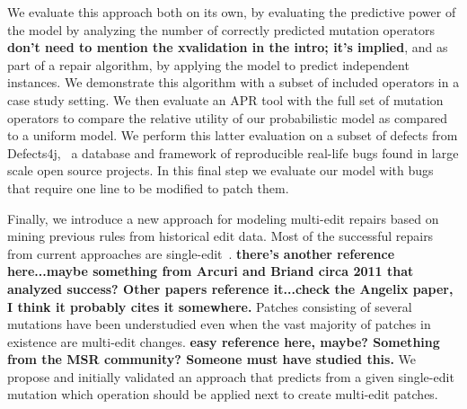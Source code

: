 \documentclass[conference]{IEEEtran}
\newcommand{\todo}[1]
  {{\scriptsize \textbf{\color{red} {#1}}}}
\begin{document}
We evaluate this approach both on its own, by evaluating the predictive power of
the model by analyzing the number of correctly predicted mutation
operators\todo{don't need to mention the xvalidation in the intro; it's implied},
and as part of a repair algorithm, by applying the model to predict independent
instances. We demonstrate this algorithm with a subset of included operators in
a case study setting.  We then evaluate an APR tool with the full set of mutation
operators to compare the relative utility of our probabilistic model as compared
to a uniform model.  We perform this latter evaluation on a subset of defects
from Defects4j,~\cite{just14} a 
database and framework of reproducible real-life bugs found in large scale open 
source projects. In this final step we evaluate our model with bugs that require 
one line to be modified to patch them. 

Finally, we introduce a new approach for modeling multi-edit repairs based on
mining previous rules from historical edit data. Most of the
successful repairs from current approaches are
single-edit~\cite{Weimer13,Qi15,kim2013}.\todo{there's another reference
  here...maybe something from Arcuri and Briand circa 2011 that analyzed
  success?  Other papers reference it...check the Angelix paper, I think it
  probably cites it somewhere.}  Patches
consisting of several mutations have been understudied even when the vast majority
of patches in existence are multi-edit changes.\todo{easy reference here, maybe?
   Something from the MSR community?  Someone must have studied this.}  We
 propose and initially validated an approach that predicts from a given 
single-edit mutation which operation should be applied
next to create multi-edit patches. 
\end{document}
